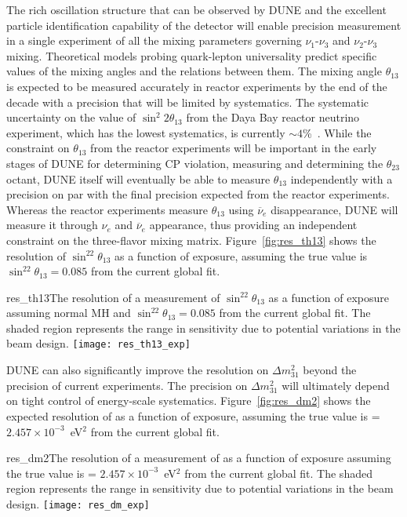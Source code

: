 The rich oscillation structure that can be observed by DUNE and the
excellent particle identification capability of the detector
will enable precision measurement  in a single experiment of all the mixing parameters
governing $\nu_1$-$\nu_3$ and $\nu_2$-$\nu_3$ mixing. Theoretical models probing quark-lepton
universality predict specific values of the mixing angles and the
relations between them. The
mixing angle $\theta_{13}$ is
expected to be measured accurately in reactor experiments by the end
of the decade with a precision that will be limited by
systematics. The systematic uncertainty on the value of $\sin ^ 2 2
\theta_{13}$ from the Daya Bay reactor neutrino experiment, which has
the lowest systematics, is currently $\sim4$\%~\cite{An:2013zwz}.
While the constraint on $\theta_{13}$ from the reactor experiments will be
important in the
early stages of DUNE for determining CP violation, measuring
\deltacp and determining the $\theta_{23}$ octant, 
DUNE itself will eventually be able to measure
$\theta_{13}$ independently with a precision on par with the final
precision expected from the reactor experiments. 
Whereas the reactor experiments measure $\theta_{13}$ using $\overline{\nu}_e$
disappearance, DUNE will measure it through $\nu_e$ and
$\overline{\nu}_e$ appearance, thus providing an independent constraint on
the three-flavor mixing matrix.   Figure~\ref{fig:res_th13} shows the resolution of $\sin^22\theta_{13}$ as a function of exposure, assuming the true value is $\sin^22\theta_{13} = 0.085$ from the current global fit.

\begin{cdrfigure}{res_th13}{The resolution of a measurement of $\sin^22\theta_{13}$ as a function of exposure assuming normal MH and $\sin^22\theta_{13} = 0.085$ from the current global fit. The shaded region represents the range in sensitivity due to potential variations in the beam design.  }
 \texttt{[image: res\_th13\_exp]}
\end{cdrfigure}

DUNE can also significantly improve the
resolution on $\Delta m^2_{31}$ beyond the precision of current experiments.  The
precision on $\Delta m^2_{31}$ will ultimately depend on tight control
of energy-scale systematics.  Figure~\ref{fig:res_dm2} shows the expected resolution of  as a function of exposure, assuming the true value is  = $2.457\times10^{-3}$~eV$^2$ from the current global fit.

\begin{cdrfigure}{res_dm2}{The resolution of a measurement of  as a function of exposure assuming the true value is  = $2.457\times10^{-3}$~eV$^2$ from the current global fit. The shaded region represents the range in sensitivity due to potential variations in the beam design.  }
 \texttt{[image: res\_dm\_exp]}
\end{cdrfigure}

